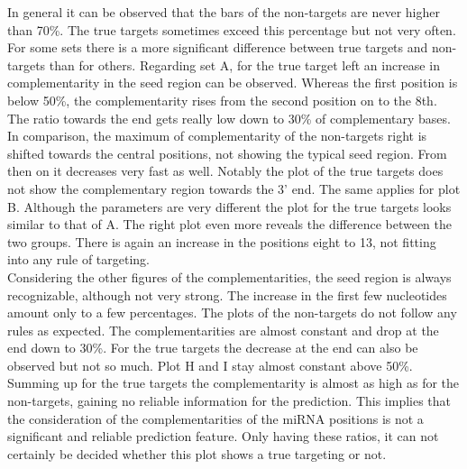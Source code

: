 \documentclass[11pt, a4paper, oneside]{book}
\begin{document}
In general it can be observed that the bars of the non-targets are never higher than 70\%. The true targets sometimes exceed this percentage but not very often. For some sets there is a more significant difference between true targets and non-targets than for others. Regarding set A, for the true target left an increase in complementarity in the seed region can be observed. Whereas the first position is below 50\%, the complementarity rises from the second position on to the 8th. The ratio towards the end gets really low down to 30\% of complementary bases. In comparison, the maximum of complementarity of the non-targets right is shifted towards the central positions, not showing the typical seed region. From then on it decreases very fast as well. Notably the plot of the true targets does not show the complementary region towards the 3' end. The same applies for plot B. Although the parameters are very different the plot for the true targets looks similar to that of A. The right plot even more reveals the difference between the two groups. There is again an increase in the positions eight to 13, not fitting into any rule of targeting. \\

Considering the other figures of the complementarities, the seed region is always recognizable, although not very strong. The increase in the first few nucleotides amount only to a few percentages. The plots of the non-targets do not follow any rules as expected. The complementarities are almost constant and drop at the end down to 30\%. For the true targets the decrease at the end can also be observed but not so much. Plot H and I stay almost constant above 50\%.\\

Summing up for the true targets the complementarity is almost as high as for the non-targets, gaining no reliable information for the prediction. This implies that the consideration of the complementarities of the miRNA positions is not a significant and reliable prediction feature. Only having these ratios, it can not certainly be decided whether this plot shows a true targeting or not. \\
\end{document}
